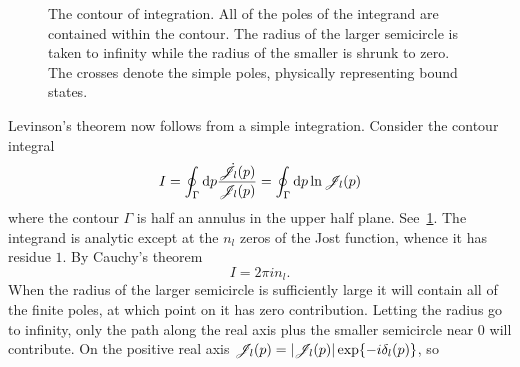 \tikzset{>=latex}
\begin{figure}[ht]
  \centering
  \caption{The contour of integration. All of the poles of the integrand are
    contained within the contour. The radius of the larger semicircle is taken
    to infinity while the radius of the smaller is shrunk to zero. The crosses
    denote the simple poles, physically representing bound states.}
  \label{fig:integration}
\end{figure}
Levinson's theorem now follows from a simple integration. Consider the
contour integral
\begin{equation*}
  I = \oint_{\Gamma} \dd p \frac{\dot{\mathscr{J}}_{l}(p)}{\mathscr{J}_{l}(p)} = \oint_{\Gamma} \dd p \ln\mathscr{J}_{l}(p)
\end{equation*}
where the contour \(\Gamma\) is half an annulus in the upper half plane. See~\cref{fig:integration}. The
integrand is analytic except at the \(n_{l}\) zeros of the Jost function, whence it has
residue \(1\). By Cauchy's theorem
\begin{equation*}
  I = 2\pi i n_{l}.
\end{equation*}
When the radius of the larger semicircle is sufficiently large it will contain
all of the finite poles, at which point on it has zero contribution. Letting the
radius go to infinity, only the
path along the real axis plus the smaller semicircle near \(0\) will contribute. On
the positive real axis \(\mathscr{J}_{l}(p) = |\mathscr{J}_{l}(p)|\exp{-i\delta_{l}(p)}\), so


